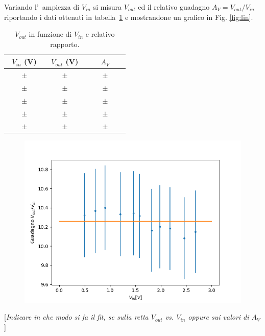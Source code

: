 \documentclass[10pt,a4paper]{article}
\newcommand{\rem}[1]{[\emph{#1}]}
\newcommand{\exn}{\phantom{xxx}}
\begin{document}
	Variando l'~ampiezza di $V_{in}$ si misura $V_{out}$ ed il relativo guadagno $A_V=V_{out}/V_{in}$ riportando i dati ottenuti in tabella~\ref{tab:guadagno} 
	e mostrandone un grafico in Fig. \ref{fig:lin}. 
	
	\begin{table}[h]
		\caption{$V_{out}$ in funzione di $V_{in}$ e relativo rapporto.}
		\label{tab:guadagno}
		\begin{center}
			\begin{tabular}{|c|c|c|}
				\hline
				$V_{in}$ (V) & $V_{out}$ (V)  & $A_V$ \\
				\hline
				\hline
				$\exn \pm \exn $ & $\exn \pm \exn $ & $\exn \pm \exn$ \\
				\hline
				$\exn \pm \exn $ & $\exn \pm \exn $ & $\exn \pm \exn $ \\
				\hline
				$\exn \pm \exn $ & $\exn \pm \exn $ & $\exn \pm \exn $ \\
				\hline
				$\exn \pm \exn $ & $\exn \pm \exn $ & $\exn \pm \exn $ \\
				\hline
				$\exn \pm \exn $ & $\exn \pm \exn $ & $\exn \pm \exn $ \\
				\hline
			\end{tabular}
		\end{center}
	\end{table}
	\begin{figure}
			\includegraphics[scale=0.5]{fit.png}
	\end{figure}
	\rem{Indicare in che modo si fa il fit, se sulla retta $V_{out}$ vs. $V_{in}$ oppure sui valori di $A_V$   }
	
\end{document}
